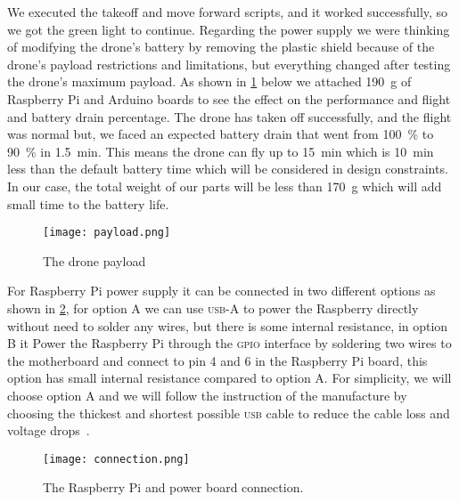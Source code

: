 \documentclass[../main.tex]{subfiles}
\begin{document}
We executed the takeoff and move forward scripts,
and it worked successfully, so we got the green 
light to continue. 
Regarding the power supply we were thinking of modifying the drone's battery
by removing the plastic shield because of the drone's
payload restrictions and limitations, but everything changed after 
testing the drone's maximum payload. As shown in \cref{fig:payload} below
we attached \SI{190}{\gram} of Raspberry Pi and Arduino boards
to see the effect on the performance and flight and
battery drain percentage. 
The drone has taken off  successfully, 
and the flight was normal but, we faced an expected 
battery drain that went from 
\SI{100}{\percent} to \SI{90}{\percent} in 
\SI{1.5}{\minute}.
This means the drone can fly up to 
\SI{15}{\minute} which is \SI{10}{\minute} 
less than the default battery time 
which will be considered in design constraints.
In our case, the total weight of our parts will be 
less than 
\SI{170}{\gram} 
which will add small time to the battery life.

\begin{figure}[tbp]
	\centering
	\texttt{[image: payload.png]}
	\caption{The drone payload}
	\label{fig:payload}
\end{figure} 

For Raspberry Pi power supply it can be connected in 
two different options as shown in \cref{fig:connection}, 
for option A we can use \textsc{usb}-\textsc{A} to power the Raspberry directly without
need to solder any wires,
but there is some internal resistance,
in option B it Power the Raspberry Pi through the \textsc{gpio} 
interface by soldering two wires to the motherboard and 
connect to pin 4 and 6 in the Raspberry Pi board,
this option has small internal resistance compared to option A.
For simplicity, we will choose option A and we will 
follow the instruction of the manufacture by choosing 
the thickest and shortest possible \textsc{usb} cable to reduce 
the cable loss and voltage drops~\cite{makerfocus}. 	 
 
 \begin{figure}[tbp]
 	\centering
 	\texttt{[image: connection.png]}
 	\caption{The Raspberry Pi and power board connection.}
 	\label{fig:connection}
 \end{figure}   
\end{document}
